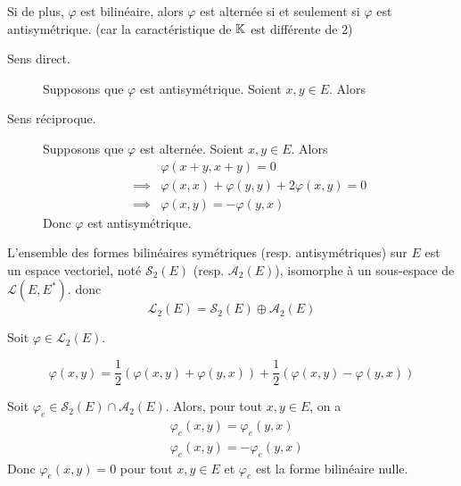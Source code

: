 \documentclass[a4paper,12pt]{article}
\begin{document}
\begin{proposition}{}{}
    Si de plus, $\varphi$ est bilinéaire, alors $\varphi$ est alternée si et seulement si $\varphi$ est antisymétrique.
    (car la caractéristique de $\mathbb{K}$ est différente de $2$)
\end{proposition}

\begin{demonstration}
    \begin{description}
        \item[Sens direct.]
        Supposons que $\varphi$ est antisymétrique. Soient $x, y \in E$. Alors
        

        \item[Sens réciproque.]
        Supposons que $\varphi$ est alternée. Soient $x, y \in E$. Alors
        \begin{align*}
            &\varphi(x + y, x + y) = 0 \\
            \implies &\varphi(x, x) + \varphi(y, y) + 2\varphi(x, y) = 0 \\
            \implies &\varphi(x, y) = -\varphi(y, x)
        \end{align*}
        Donc $\varphi$ est antisymétrique.
    \end{description}
\end{demonstration}

\begin{proposition}{}{}
    L'ensemble des formes bilinéaires symétriques (resp. antisymétriques) sur $E$ est un espace vectoriel, noté $\mathcal{S}_2(E)$ (resp. $\mathcal{A}_2(E)$), isomorphe à un sous-espace de $\mathcal{L}(E, E^*)$.
    donc
    $$
    \mathcal{L}_2(E) = \mathscr{S}_2(E) \oplus \mathscr{A}_2(E)
    $$
\end{proposition}

\begin{demonstration}
    Soit $\varphi \in \mathcal{L}_2(E)$.

    $$
    \varphi(x, y) = \frac{1}{2}(\varphi(x, y) + \varphi(y, x)) + \frac{1}{2}(\varphi(x, y) - \varphi(y, x))
    $$

    Soit $\varphi_e \in \mathscr{S}_2(E) \cap \mathscr{A}_2(E)$. Alors, pour tout $x, y \in E$, on a
    \begin{align*}
        &\varphi_e(x, y) = \varphi_e(y, x) \\
        &\varphi_e(x, y) = -\varphi_e(y, x)
    \end{align*}
    Donc $\varphi_e(x, y) = 0$ pour tout $x, y \in E$ et $\varphi_e$ est la forme bilinéaire nulle.
\end{demonstration}
\end{document}
